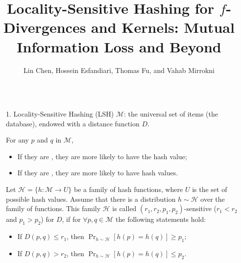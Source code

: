 \documentclass[final]{beamer}
\title{Locality-Sensitive Hashing for $f$-Divergences and \kr Kernels: 
	Mutual 
	Information Loss and Beyond}
\author{Lin Chen\inst{1,2}, 
	Hossein Esfandiari\inst{1},
	Thomas Fu\inst{1}, and
	Vahab Mirrokni\inst{1}
	 \vspace{10pt}}
\institute{{  \inst{1}Google Research, \inst{2}Yale University }\vspace{10pt}}
\DeclareMathOperator{\pr}{Pr}
\newlength{\sepwid}
\newlength{\onecolwid}
\begin{document}
	
	
	
	\begin{frame}[t] %
	\begin{columns}[t] %
	\begin{column}{\sepwid}
	\end{column}
	\begin{column}{\onecolwid} %
			\vspace{-40pt}
				
			\begin{block}{1. Locality-Sensitive Hashing (LSH)}	
				$ \mathcal{M} $: the universal set of items (the 
				database), endowed with 
				a distance function $ D $.	
				
				For any $ p $ and $ q $ in $ \mathcal{M} $,
				\begin{itemize}
					\item If they are , they are more likely 
					to 
					have the 
					 hash value;
					\item If they are , 
					they are more likely to have  hash 
					values. 
				\end{itemize}
				 
				
				  Let $ \mathcal{H} = \{ 
				h:\mathcal{M}\to U \} $ be a 
				family of hash functions, where $ U $ is the set of possible 
				hash values. 
				Assume that there is a distribution $ h\sim 
				\mathcal{H} $ over the family of 
				functions. This family $ \mathcal{H} $ is called $ (r_1, r_2, 
				p_1,p_2) 
				$-sensitive  ($ r_1<r_2 $ and $ p_1>p_2 $) for $ D $, if for $ 
				\forall p, q 
				\in \mathcal{M} $ the following statements hold:
				\begin{itemize}
					\item If $ D(p, q) \le r_1 $, then $ \pr_{h\sim 
						\mathcal{H}}[h(p)=h(q)]\ge p_1 $; 
					\item If $ D(p, q) > r_2 $, then $ \pr_{h\sim 
						\mathcal{H}}[h(p)=h(q)]\le p_2 $.
				\end{itemize}
				

		\end{block}
			

\end{column}
\end{columns}
\end{frame}
\end{document}
